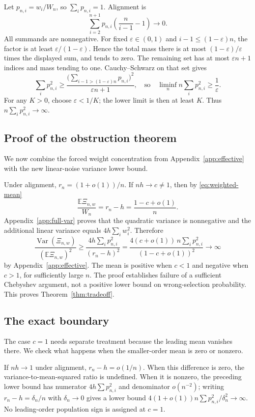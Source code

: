 \documentclass[11pt]{article}
\theoremstyle{definition}
\begin{document}
Let $p_{n,i}=w_i/W_n$, so $\sum_i p_{n,i}=1$. Alignment is
\[
\sum_{i=2}^{n+1}p_{n,i}\left(\frac{n}{i-1}-1\right)\to0.
\]
All summands are nonnegative. For fixed $\varepsilon\in(0,1)$ and $i-1\le(1-\varepsilon)n$, the factor is at least $\varepsilon/(1-\varepsilon)$. Hence the total mass there is at most $(1-\varepsilon)/\varepsilon$ times the displayed sum, and tends to zero. The remaining set has at most $\varepsilon n+1$ indices and mass tending to one. Cauchy--Schwarz on that set gives
\[
\sum_i p_{n,i}^2\ge
\frac{\bigl(\sum_{i-1>(1-\varepsilon)n}p_{n,i}\bigr)^2}
{\varepsilon n+1},
\quad\text{so}\quad
\liminf_n n\sum_i p_{n,i}^2\ge\frac1\varepsilon.
\]
For any $K>0$, choose $\varepsilon<1/K$; the lower limit is then at least $K$. Thus $n\sum_i p_{n,i}^2\to\infty$.

\subsection{Proof of the obstruction theorem}\label{app:obstruction}
We now combine the forced weight concentration from Appendix~\ref{app:effective} with the new linear-noise variance lower bound.

Under alignment, $r_n=(1+o(1))/n$. If $nh\to c\ne1$, then by \eqref{eq:weighted-mean}
\[
\frac{\mathbb E\Xi_{n,w}}{W_n}=r_n-h
=\frac{1-c+o(1)}n.
\]
Appendix~\ref{app:full-var} proves that the quadratic variance is nonnegative and the additional linear variance equals $4h\sum_iw_i^2$. Therefore
\[
\frac{\operatorname{Var}(\Xi_{n,w})}{(\mathbb E\Xi_{n,w})^2}
\ge
\frac{4h\sum_i p_{n,i}^2}{(r_n-h)^2}
=
\frac{4(c+o(1))\,n\sum_i p_{n,i}^2}
{(1-c+o(1))^2}\to\infty
\]
by Appendix~\ref{app:effective}. The mean is positive when $c<1$ and negative when $c>1$, for sufficiently large $n$. The proof establishes failure of a sufficient Chebyshev argument, not a positive lower bound on wrong-selection probability. This proves Theorem~\ref{thm:tradeoff}.

\subsection{The exact boundary}\label{app:boundary}
The case $c=1$ needs separate treatment because the leading mean vanishes there. We check what happens when the smaller-order mean is zero or nonzero.

If $nh\to1$ under alignment, $r_n-h=o(1/n)$. When this difference is zero, the variance-to-mean-squared ratio is undefined. When it is nonzero, the preceding lower bound has numerator $4h\sum p_{n,i}^2$ and denominator $o(n^{-2})$; writing $r_n-h=\delta_n/n$ with $\delta_n\to0$ gives a lower bound $4(1+o(1))n\sum p_{n,i}^2/\delta_n^2\to\infty$. No leading-order population sign is assigned at $c=1$.
\end{document}
